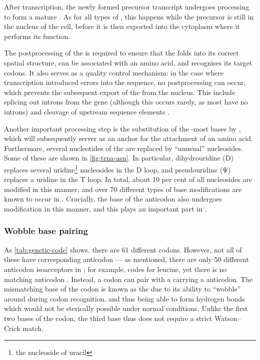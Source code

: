 After transcription, the newly formed precursor \trna transcript undergoes
processing to form a mature \trna. As for all types of \rna, this happens while
the precursor \trna is still in the nucleus of the cell, before it is then
exported into the cytoplasm where it performs its function.

The postprocessing of the \trna is required to ensure that the \trna folds into
its correct spatial structure, can be associated with an amino acid, and
recognises its target codons. It also serves as a quality control mechanism: in
the case where transcription introduced errors into the \trna sequence, no
postprocessing can occur, which prevents the subsequent export of the \trna from
the nucleus. This include splicing out introns from the \trna gene (although
this occurs rarely, as most \trna[s] have no introns) and cleavage of \fivep
upstream sequence elements \citep{Alberts:2002,Berg:2002}.

Another important processing step is the substitution of the \threep-most bases
by , which will subsequently server as an anchor for the
attachment of an amino acid. Furthermore, several nucleotides of the \trna are
replaced by “unusual” nucleosides. Some of these are shown in
\cref{fig:trna-asn}. In particular, dihydrouridine (\seq D) replaces several
uridine\footnote{the nucleoside of uracil} nucleosides in the D loop, and
pseudouridine (\seq Ψ) replaces a uridine in the T loop. In total, about
\num{10} per cent of all nucleosides are modified in this manner, and over
\num{70} different types of base modifications are known to occur in \trna
\citep{Limbach:1994,Dalluge:1997,Alberts:2002}. Crucially, the \fivep base of
the anticodon also undergoes modification in this manner, and this plays an
important part in .

\subsubsection{Wobble base pairing}

As \cref{tab:genetic-code} shows, there are \num{61} different codons. However,
not all of these have corresponding anticodon \trna[s] --- as mentioned, there
are only \num{50} different anticodon isoacceptors in \mmu; for example,
 codes for leucine, yet there is no matching 
anticodon \trna. Instead, a  codon can pair with a \trna carrying a
 anticodon. The mismatching \threep base of the codon is known as
the  due to its ability to “wobble” around during codon
recognition, and thus being able to form hydrogen bonds which would not be
sterically possible under normal conditions. Unlike the first two bases of the
codon, the third base thus does not require a strict Watson--Crick match.

